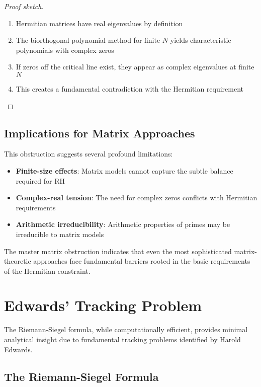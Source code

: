 \begin{proof}[Proof sketch]
\begin{enumerate}
\item Hermitian matrices have real eigenvalues by definition
\item The biorthogonal polynomial method for finite $N$ yields characteristic polynomials with complex zeros
\item If zeros off the critical line exist, they appear as complex eigenvalues at finite $N$
\item This creates a fundamental contradiction with the Hermitian requirement
\end{enumerate}
\end{proof}

\subsection{Implications for Matrix Approaches}

This obstruction suggests several profound limitations:

\begin{itemize}
\item \textbf{Finite-size effects}: Matrix models cannot capture the subtle balance required for RH
\item \textbf{Complex-real tension}: The need for complex zeros conflicts with Hermitian requirements
\item \textbf{Arithmetic irreducibility}: Arithmetic properties of primes may be irreducible to matrix models
\end{itemize}

\begin{remark}
The master matrix obstruction indicates that even the most sophisticated matrix-theoretic approaches face fundamental barriers rooted in the basic requirements of the Hermitian constraint.
\end{remark}

\section{Edwards' Tracking Problem}
\label{sec:edwards_tracking}

The Riemann-Siegel formula, while computationally efficient, provides minimal analytical insight due to fundamental tracking problems identified by Harold Edwards.

\subsection{The Riemann-Siegel Formula}

